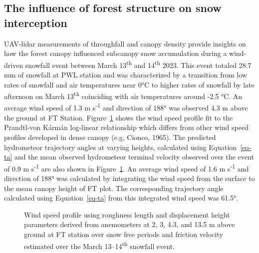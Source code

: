 \documentclass[
  letterpaper,
  DIV=11,
  numbers=noendperiod]{scrartcl}
\begin{document}
\subsection{The influence of forest structure on snow
interception}\label{the-influence-of-forest-structure-on-snow-interception}

UAV-lidar measurements of throughfall and canopy density provide
insights on how the forest canopy influenced subcanopy snow accumulation
during a wind-driven snowfall event between March 13\textsuperscript{th}
and 14\textsuperscript{th} 2023. This event totaled 28.7 mm of snowfall
at PWL station and was characterized by a transition from low rates of
snowfall and air temperatures near 0°C to higher rates of snowfall by
late afternoon on March 13\textsuperscript{th} coinciding with air
temperatures around -2.5 °C. An average wind speed of 1.3 m
s\textsuperscript{-1} and direction of 188° was observed 4.3 m above the
ground at FT Station. Figure~\ref{fig-wind-profiles} shows the wind
speed profile fit to the Prandtl-von Kármán log-linear relationship
which differs from other wind speed profiles developed in dense canopy
(e.g, Cionco, 1965). The predicted hydrometeor trajectory angles at
varying heights, calculated using Equation~\ref{eq-ta} and the mean
observed hydrometeor terminal velocity observed over the event of 0.9 m
s\textsuperscript{-1} are also shown in Figure~\ref{fig-wind-profiles}.
An average wind speed of 1.6 m s\textsuperscript{-1} and direction of
188° was calculated by integrating the wind speed from the surface to
the mean canopy height of FT plot. The corresponding trajectory angle
calculated using Equation~\ref{eq-ta} from this integrated wind speed
was 61.5°.

\begin{figure}[H]


\caption{\label{fig-wind-profiles}Wind speed profile using roughness
length and displacement height parameters derived from anemometers at 2,
3, 4.3, and 13.5 m above ground at FT station over snow free periods and
friction velocity estimated over the March 13--14\textsuperscript{th}
snowfall event.}

\end{figure}%
\end{document}
